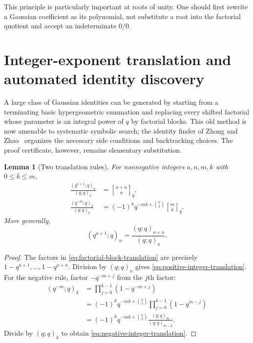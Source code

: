 \documentclass[11pt,oneside,openany]{book}
\newtheorem{lemma}[lemma]{Lemma}
\theoremstyle{definition}
\theoremstyle{remark}
\newcommand{\Qbinom}[3]{\genfrac{[}{]}{0pt}{}{#1}{#2}_{#3}}
\begin{document}
This principle is particularly important at roots of unity.  One should first rewrite a Gaussian coefficient as its polynomial, not substitute a root into the factorial quotient and accept an indeterminate $0/0$.

\section{Integer-exponent translation and automated identity discovery}\label{sec:identity-discovery}

A large class of Gaussian identities can be generated by starting from a terminating basic hypergeometric summation and replacing every shifted factorial whose parameter is an integral power of $q$ by factorial blocks.  This old method is now amenable to systematic symbolic search; the identity finder of Zhong and Zhao~\cite{ZhongZhao2026} organizes the necessary side conditions and backtracking choices.  The proof certificate, however, remains elementary substitution.

\begin{lemma}[Two translation rules]\label{lem:integer-qpochhammer-translation}
For nonnegative integers $a,n,m,k$ with $0\le k\le m$,
\begin{align}
 \frac{(q^{a+1};q)_n}{(q;q)_n}
 &=\Qbinom{a+n}{n}{q},
 \label{eq:positive-integer-translation}\\
 \frac{(q^{-m};q)_k}{(q;q)_k}
 &=(-1)^kq^{-mk+\binom k2}\Qbinom{m}{k}{q}.
 \label{eq:negative-integer-translation}
\end{align}
More generally,
\begin{equation}\label{eq:factorial-block-translation}
 (q^{a+1};q)_n=\frac{(q;q)_{a+n}}{(q;q)_a}.
\end{equation}
\end{lemma}

\begin{proof}
The factors in \eqref{eq:factorial-block-translation} are precisely
$1-q^{a+1},\ldots,1-q^{a+n}$.  Division by $(q;q)_n$ gives
\eqref{eq:positive-integer-translation}.  For the negative rule, factor
$-q^{-m+j}$ from the $j$th factor:
\begin{align*}
 (q^{-m};q)_k
 &=\prod_{j=0}^{k-1}(1-q^{-m+j})\\
 &=(-1)^kq^{-mk+\binom k2}
   \prod_{j=0}^{k-1}(1-q^{m-j})\\
 &=(-1)^kq^{-mk+\binom k2}
   \frac{(q;q)_m}{(q;q)_{m-k}}.
\end{align*}
Divide by $(q;q)_k$ to obtain \eqref{eq:negative-integer-translation}.
\end{proof}
\end{document}
